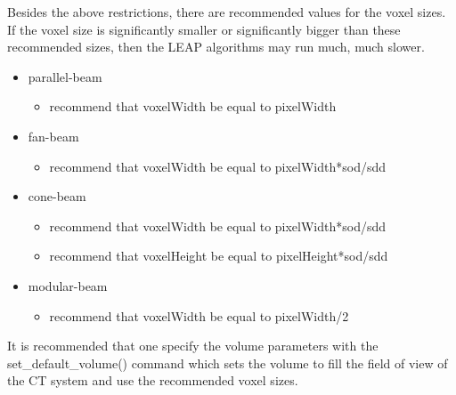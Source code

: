 \documentclass[11pt]{article}
\begin{document}
Besides the above restrictions, there are recommended values for the voxel sizes.  If the voxel size is significantly smaller or significantly bigger than these recommended sizes, then the LEAP algorithms may run much, much slower.

\begin{itemize}
\item parallel-beam
    \begin{itemize}
    \item recommend that voxelWidth be equal to pixelWidth
    \end{itemize}
\item fan-beam
    \begin{itemize}
    \item recommend that voxelWidth be equal to pixelWidth*sod/sdd
    \end{itemize}
\item cone-beam
    \begin{itemize}
    \item recommend that voxelWidth be equal to pixelWidth*sod/sdd
    \item recommend that voxelHeight be equal to pixelHeight*sod/sdd
    \end{itemize}
\item modular-beam
    \begin{itemize}
    \item recommend that voxelWidth be equal to pixelWidth/2
    \end{itemize}
\end{itemize}

It is recommended that one specify the volume parameters with the set\_default\_volume() command which sets the volume to fill the field of view of the CT system and use the recommended voxel sizes.
\end{document}
